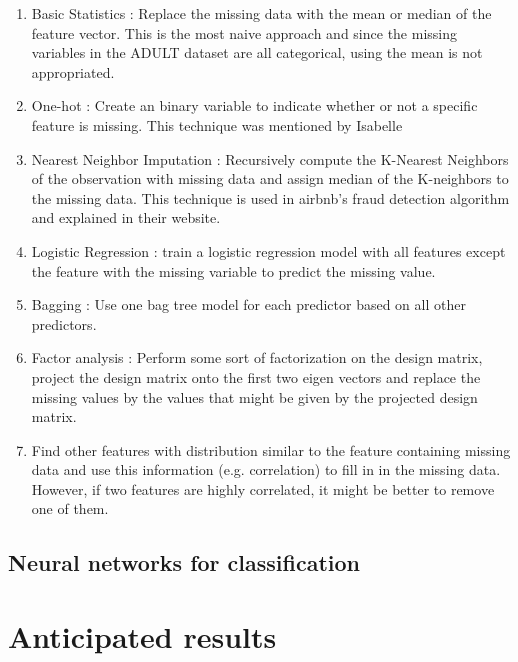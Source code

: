 \documentclass[12pt]{article}
\begin{document}
\begin{enumerate}
\item Basic Statistics : Replace the missing data with the mean or median of the feature vector. This is the most naive approach and since the missing variables in the ADULT dataset are all categorical, using the mean is not appropriated.
\item One-hot : Create an binary variable to indicate whether or not a specific feature is missing. This technique was mentioned by Isabelle
\item Nearest Neighbor Imputation : Recursively compute the K-Nearest Neighbors of the observation with missing data and assign median of the K-neighbors to the missing data. This technique is used in airbnb's fraud detection algorithm and explained in their website.
\item Logistic Regression : train a logistic regression model with all features except the feature with the missing variable to predict the missing value.
\item Bagging : Use one bag tree model for each predictor based on all other
   predictors.
\item Factor analysis : Perform some sort of factorization on the design matrix, project the design matrix onto the first two eigen vectors and replace the missing values by the values that might be given by the projected design matrix.
\item Find other features with distribution similar to the feature containing missing data and use this information (e.g. correlation) to fill in in the missing data. However, if two features are highly correlated, it might be better to remove one of them.
\end{enumerate}

\subsection{Neural networks for classification}

\section{Anticipated results}

\pagebreak




%
%

\itemize
\end{document}
